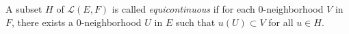 A subset \(H\) of \(\mathcal{L}(E, F)\) is called \textit{equicontinuous} if for each \(0\)-neighborhood \(V\) in \(F\), there exists a \(0\)-neighborhood \(U\) in \(E\) such that \(u(U) \subset V\) for all \(u \in H\).